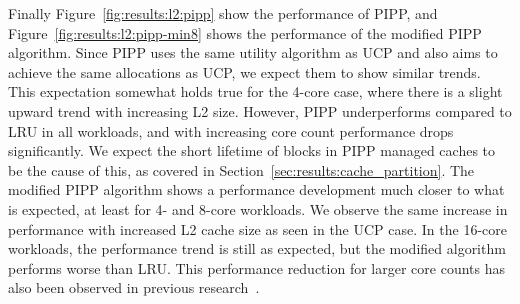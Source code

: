 Finally Figure~\ref{fig:results:l2:pipp} show the performance of PIPP, and Figure~\ref{fig:results:l2:pipp-min8} shows the performance of the modified PIPP algorithm.
Since PIPP uses the same utility algorithm as UCP and also aims to achieve the same allocations as UCP, we expect them to show similar trends.
This expectation somewhat holds true for the 4-core case, where there is a slight upward trend with increasing L2 size.
However, PIPP underperforms compared to LRU in all workloads, and with increasing core count performance drops significantly.
We expect the short lifetime of blocks in PIPP managed caches to be the cause of this, as covered in Section~\ref{sec:results:cache_partition}.
The modified PIPP algorithm shows a performance development much closer to what is expected, at least for 4- and 8-core workloads.
We observe the same increase in performance with increased L2 cache size as seen in the UCP case. 
In the 16-core workloads, the performance trend is still as expected, but the modified algorithm performs worse than LRU.
This performance reduction for larger core counts has also been observed in previous research~\cite{Manikantan2012}.
